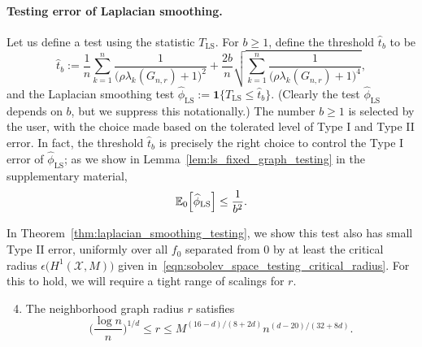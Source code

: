 \documentclass{article}
\newcommand{\1}{\mathbf{1}}
\newcommand{\Xset}{\mathcal{X}}
\newcommand{\Ebb}{\mathbb{E}}
\newcommand{\wh}[1]{\widehat{#1}}
\newcommand{\LS}{\mathrm{LS}}
\theoremstyle{alden}
\theoremstyle{aldenthm}
\theoremstyle{definition}
\theoremstyle{remark}
\begin{document}
\paragraph{Testing error of Laplacian smoothing.}
Let us define a test using the statistic $T_{\LS}$. For $b \geq 1$, define the threshold $\wh{t}_b$ to be
\begin{equation*}
\wh{t}_{b} := \frac{1}{n}\sum_{k = 1}^{n} \frac{1}{\bigl(\rho \lambda_k(G_{n,r}) + 1\bigr)^2} + \frac{2b}{n}\sqrt{\sum_{k = 1}^{n} \frac{1}{\bigl(\rho \lambda_k(G_{n,r}) + 1\bigr)^4}},
\end{equation*}
and the Laplacian smoothing test $\wh{\phi}_{\LS} := \1\bigl\{T_{\LS} \leq \wh{t}_b\bigr\}$. (Clearly the test $\wh{\phi}_{\LS}$ depends on $b$, but we suppress this notationally.) The number $b \geq 1$ is selected by the user, with the choice made based on the tolerated level of Type I and Type II error. In fact, the threshold $\wh{t}_b$ is precisely the right choice to control the Type I error of $\wh{\phi}_{\LS}$; as we show in Lemma~\ref{lem:ls_fixed_graph_testing} in the supplementary material,
\begin{equation*}
\Ebb_0\Bigl[\wh{\phi}_{\LS}\Bigr] \leq \frac{1}{b^2}.
\end{equation*}

In Theorem~\ref{thm:laplacian_smoothing_testing}, we show this test also has small Type II error, uniformly over all $f_0$ separated from $0$ by at least the critical radius $\epsilon\bigl(H^1(\Xset,M)\bigr)$ given in~\eqref{eqn:sobolev_space_testing_critical_radius}. For this to hold, we will require a tight range of scalings for $r$.
\begin{enumerate}[label=(R\arabic*)]
	\setcounter{enumi}{3}
	\item 
	\label{asmp:ls_kernel_radius_testing}
	The neighborhood graph radius $r$ satisfies
	\begin{equation*}
	\biggl(\frac{\log n}{n}\biggr)^{1/d} \leq r \leq M^{(16 - d)/(8 + 2d)}n^{(d - 20)/(32 + 8d)}.
	\end{equation*}
\end{enumerate}
\end{document}
